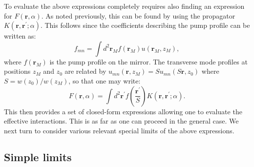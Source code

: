 \documentclass[pra,twocolumn,superscriptaddress]{revtex4-1}
\newcommand{\vect}[1]{\mathbf{#1}}
\newcommand{\transverse}{u}
\begin{document}
To evaluate the above expressions completely requires also finding an
expression for $F(\vect{r}, \alpha)$.  As noted previously, this can
be found by using the propagator $K(\vect r, \vect r^\prime;\alpha)$.
This follows since the coefficients describing the pump profile can be
written as:
\begin{displaymath}
  f_{mn} = \int d^2\vect r_M
  f(\vect r_M)
  \transverse(\vect r_M, z_M),
\end{displaymath}
where $f(\vect r_M)$ is the pump profile on the mirror.  The
transverse mode profiles at positions $z_M$ and $z_0$ are related by
$\transverse_{mn}(\vect{r}, z_M) = S \transverse_{mn}(S\vect{r}, z_0)$
where $S = w(z_0)/w(z_M)$, so that one may write:
\begin{equation}
  \label{eq:11}
  F(\vect{r},\alpha)
  =
  \int d^2\vect r^\prime
  f\left(\frac{\vect r^\prime}{S}\right)
  K(\vect r,  \vect r^\prime; \alpha).
\end{equation}
This then provides a set of closed-form expressions allowing one to
evaluate the effective interactions.  This is as far as one can
proceed in the general case.  We next turn to consider various
relevant special limits of the above expressions.

\subsection{Simple limits}
\label{sec:symmetric-limit}
\end{document}
